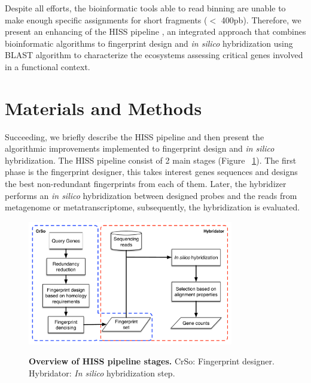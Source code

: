 \documentclass[10pt,letterpaper]{article}
\begin{document}
Despite all efforts, the bioinformatic tools able to read binning are unable to make enough specific assignments for short fragments ($<$ 400pb)\cite{Brady:2009ia,Mende:2012bg}. Therefore, we present an enhancing of the HISS pipeline \cite{TorresEstupinan:2014dx}, an integrated approach that combines bioinformatic algorithms to fingerprint design and \textit{in silico} hybridization using BLAST algorithm to characterize the ecosystems assessing critical genes involved in a functional context.

\section*{Materials and Methods}
Succeeding, we briefly describe the HISS pipeline and then present the algorithmic improvements implemented to fingerprint design and \textit{in silico} hybridization. The HISS pipeline consist of 2 main stages (Figure ~\ref{fig1}). The first phase is the fingerprint designer, this takes interest genes sequences and designs the best non-redundant fingerprints from each of them. Later, the hybridizer performs an \textit{in silico} hybridization between designed probes and the reads from metagenome or metatranscriptome, subsequently, the hybridization is evaluated.

\begin{figure}[!htpb] 
\caption{{\bf Overview of HISS pipeline stages.}
CrSo: Fingerprint designer. Hybridator: \textit{In silico} hybridization step.}
\centering
\label{fig1}
\includegraphics[width=0.8\textwidth,natwidth=610,natheight=642]{imgs/Fig1.pdf}\\

\end{figure}
\end{document}
